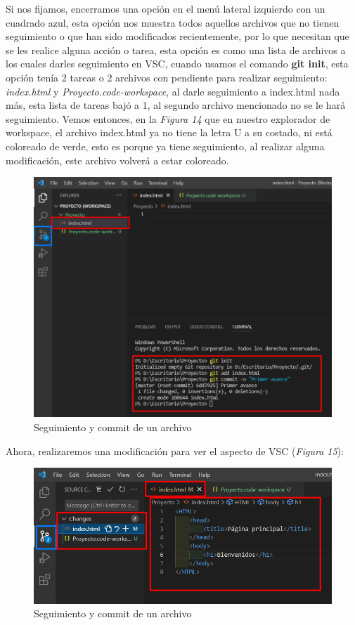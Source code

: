 Si nos fijamos, encerramos una opción en el menú lateral izquierdo con un cuadrado azul, esta opción nos muestra todos aquellos archivos que no tienen seguimiento o que han sido modificados recientemente, por lo que necesitan que se les realice alguna acción o tarea, esta opción es como una lista de archivos a los cuales darles seguimiento en VSC, cuando usamos el comando \textbf{git init}, esta opción tenía 2 tareas o 2 archivos con pendiente para realizar seguimiento: \textit{index.html} y \textit{Proyecto.code-workspace}, al darle seguimiento a index.html nada más, esta lista de tareas bajó a 1, al segundo archivo mencionado no se le hará seguimiento. Vemos entonces, en la \textit{Figura 14} que en nuestro explorador de workspace, el archivo index.html ya no tiene la letra U a su costado, ni está coloreado de verde, esto es porque ya tiene seguimiento, al realizar alguna modificación, este archivo volverá a estar coloreado.
\begin{figure}[H]
    \begin{center}
        \caption{Seguimiento y commit de un archivo}
        \label{fig: 14}
        \includegraphics[width=12cm]{capturas/git add git commit.png}
    \end{center}
\end{figure}

Ahora, realizaremos una modificación para ver el aspecto de VSC (\textit{Figura 15}):
\begin{figure}[H]
    \begin{center}
        \caption{Seguimiento y commit de un archivo}
        \label{fig: 15}
        \includegraphics[width=12cm]{capturas/modificaciones.png}
    \end{center}
\end{figure}

